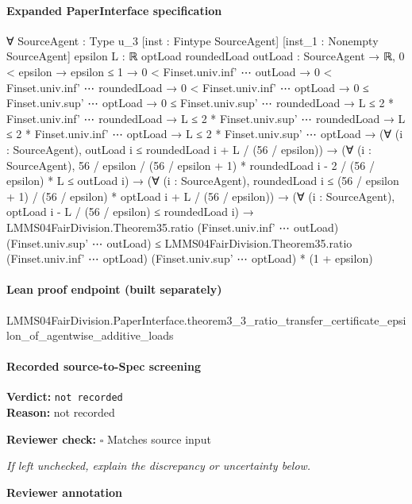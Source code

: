 \documentclass[10pt]{article}
\newcommand{\reviewerbox}{%
  \par\noindent\fbox{\parbox{0.96\linewidth}{\rule{0pt}{0.38in}}}\par
}
\newcommand{\reviewmatch}[1]{%
  \par\noindent\textbf{Reviewer check:} $\square$\; #1\par
  \noindent\emph{If left unchecked, explain the discrepancy or uncertainty below.}\par
}
\begin{document}
\paragraph{Expanded PaperInterface specification}
\begin{ReviewVerbatim}
∀ {SourceAgent : Type u_3} [inst : Fintype SourceAgent] [inst_1 : Nonempty SourceAgent] {epsilon L : ℝ}
  {optLoad roundedLoad outLoad : SourceAgent → ℝ},
  0 < epsilon →
    epsilon ≤ 1 →
      0 < Finset.univ.inf' ⋯ outLoad →
        0 < Finset.univ.inf' ⋯ roundedLoad →
          0 < Finset.univ.inf' ⋯ optLoad →
            0 ≤ Finset.univ.sup' ⋯ optLoad →
              0 ≤ Finset.univ.sup' ⋯ roundedLoad →
                L ≤ 2 * Finset.univ.inf' ⋯ roundedLoad →
                  L ≤ 2 * Finset.univ.sup' ⋯ roundedLoad →
                    L ≤ 2 * Finset.univ.inf' ⋯ optLoad →
                      L ≤ 2 * Finset.univ.sup' ⋯ optLoad →
                        (∀ (i : SourceAgent), outLoad i ≤ roundedLoad i + L / (56 / epsilon)) →
                          (∀ (i : SourceAgent),
                              56 / epsilon / (56 / epsilon + 1) * roundedLoad i - 2 / (56 / epsilon) * L ≤ outLoad i) →
                            (∀ (i : SourceAgent),
                                roundedLoad i ≤ (56 / epsilon + 1) / (56 / epsilon) * optLoad i + L / (56 / epsilon)) →
                              (∀ (i : SourceAgent), optLoad i - L / (56 / epsilon) ≤ roundedLoad i) →
                                LMMS04FairDivision.Theorem35.ratio (Finset.univ.inf' ⋯ outLoad)
                                    (Finset.univ.sup' ⋯ outLoad) ≤
                                  LMMS04FairDivision.Theorem35.ratio (Finset.univ.inf' ⋯ optLoad)
                                      (Finset.univ.sup' ⋯ optLoad) *
                                    (1 + epsilon)
\end{ReviewVerbatim}

\paragraph{Lean proof endpoint (built separately)}\begin{ReviewVerbatim}
LMMS04FairDivision.PaperInterface.theorem3_3_ratio_transfer_certificate_epsilon_of_agentwise_additive_loads
\end{ReviewVerbatim}

\paragraph{Recorded source-to-Spec screening}
\textbf{Verdict:} \texttt{not recorded}
\\
\textbf{Reason:} not recorded
\reviewmatch{Matches source input}
\noindent\textbf{Reviewer annotation}\par
\reviewerbox
\clearpage
\hypertarget{source-claim-fa0da40259a9d26f}{}
\end{document}
